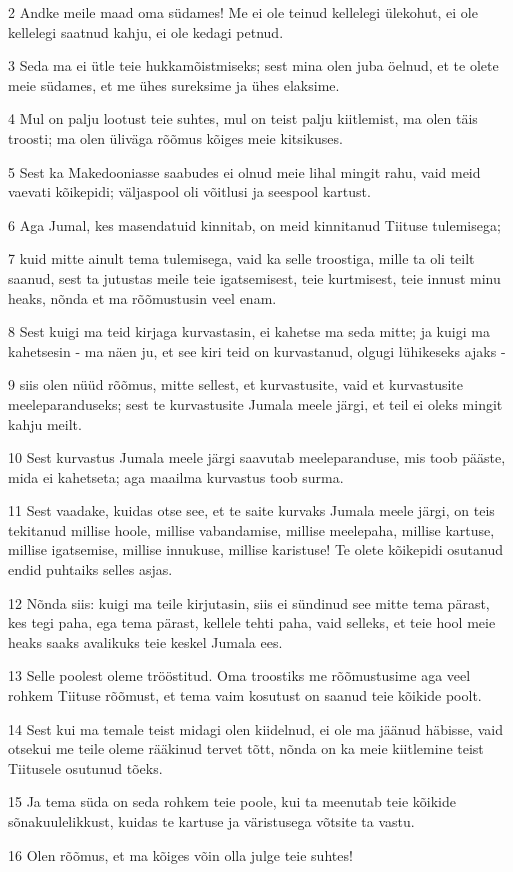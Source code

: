 \par 2 Andke meile maad oma südames! Me ei ole teinud kellelegi ülekohut, ei ole kellelegi saatnud kahju, ei ole kedagi petnud.
\par 3 Seda ma ei ütle teie hukkamõistmiseks; sest mina olen juba öelnud, et te olete meie südames, et me ühes sureksime ja ühes elaksime.
\par 4 Mul on palju lootust teie suhtes, mul on teist palju kiitlemist, ma olen täis troosti; ma olen üliväga rõõmus kõiges meie kitsikuses.
\par 5 Sest ka Makedooniasse saabudes ei olnud meie lihal mingit rahu, vaid meid vaevati kõikepidi; väljaspool oli võitlusi ja seespool kartust.
\par 6 Aga Jumal, kes masendatuid kinnitab, on meid kinnitanud Tiituse tulemisega;
\par 7 kuid mitte ainult tema tulemisega, vaid ka selle troostiga, mille ta oli teilt saanud, sest ta jutustas meile teie igatsemisest, teie kurtmisest, teie innust minu heaks, nõnda et ma rõõmustusin veel enam.
\par 8 Sest kuigi ma teid kirjaga kurvastasin, ei kahetse ma seda mitte; ja kuigi ma kahetsesin - ma näen ju, et see kiri teid on kurvastanud, olgugi lühikeseks ajaks -
\par 9 siis olen nüüd rõõmus, mitte sellest, et kurvastusite, vaid et kurvastusite meeleparanduseks; sest te kurvastusite Jumala meele järgi, et teil ei oleks mingit kahju meilt.
\par 10 Sest kurvastus Jumala meele järgi saavutab meeleparanduse, mis toob pääste, mida ei kahetseta; aga maailma kurvastus toob surma.
\par 11 Sest vaadake, kuidas otse see, et te saite kurvaks Jumala meele järgi, on teis tekitanud millise hoole, millise vabandamise, millise meelepaha, millise kartuse, millise igatsemise, millise innukuse, millise karistuse! Te olete kõikepidi osutanud endid puhtaiks selles asjas.
\par 12 Nõnda siis: kuigi ma teile kirjutasin, siis ei sündinud see mitte tema pärast, kes tegi paha, ega tema pärast, kellele tehti paha, vaid selleks, et teie hool meie heaks saaks avalikuks teie keskel Jumala ees.
\par 13 Selle poolest oleme trööstitud. Oma troostiks me rõõmustusime aga veel rohkem Tiituse rõõmust, et tema vaim kosutust on saanud teie kõikide poolt.
\par 14 Sest kui ma temale teist midagi olen kiidelnud, ei ole ma jäänud häbisse, vaid otsekui me teile oleme rääkinud tervet tõtt, nõnda on ka meie kiitlemine teist Tiitusele osutunud tõeks.
\par 15 Ja tema süda on seda rohkem teie poole, kui ta meenutab teie kõikide sõnakuulelikkust, kuidas te kartuse ja väristusega võtsite ta vastu.
\par 16 Olen rõõmus, et ma kõiges võin olla julge teie suhtes!


